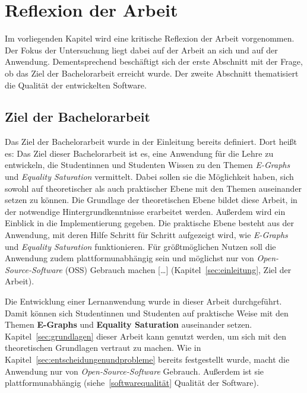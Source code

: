 \section{Reflexion der Arbeit}\label{sec:reflexion}

Im vorliegenden Kapitel wird eine kritische Reflexion der Arbeit vorgenommen. 
Der Fokus der Untersuchung liegt dabei auf der Arbeit an sich und auf der Anwendung.
Dementsprechend beschäftigt sich der erste Abschnitt mit der Frage, ob das Ziel der Bachelorarbeit erreicht wurde.
Der zweite Abschnitt thematisiert die Qualität der entwickelten Software.



\subsection{Ziel der Bachelorarbeit}

Das Ziel der Bachelorarbeit wurde in der Einleitung bereits definiert. Dort heißt es: 
\glqq Das Ziel dieser Bachelorarbeit ist es, eine Anwendung für die Lehre zu entwickeln, die Studentinnen und Studenten Wissen zu den Themen \textit{E-Graphs} und \textit{Equality Saturation}
vermittelt. Dabei sollen sie die Möglichkeit haben, sich sowohl auf theoretischer als auch praktischer Ebene mit den Themen auseinander setzen zu können.
Die Grundlage der theoretischen Ebene bildet diese Arbeit, in der notwendige Hintergrundkenntnisse erarbeitet werden. Außerdem wird ein Einblick in die Implementierung gegeben. 
Die praktische Ebene besteht aus der Anwendung, mit deren Hilfe Schritt für Schritt aufgezeigt wird, wie \textit{E-Graphs} und \textit{Equality Saturation} funktionieren.
Für grö{\ss}tmöglichen Nutzen soll die Anwendung zudem plattformunabhängig sein und möglichst nur von \textit{Open-Source-Software} (OSS) Gebrauch machen [\ldots]\grqq 
(Kapitel~\ref{sec:einleitung}, Ziel der Arbeit).

Die Entwicklung einer Lernanwendung wurde in dieser Arbeit durchgeführt. Damit können sich Studentinnen und Studenten auf praktische Weise mit den Themen 
\textbf{E-Graphs} und \textbf{Equality Saturation} auseinander setzen. Kapitel~\ref{sec:grundlagen} dieser Arbeit kann genutzt werden, um sich mit den
theoretischen Grundlagen vertraut zu machen. 
Wie in Kapitel~\ref{sec:entscheidungenundprobleme} bereits festgestellt wurde, macht die Anwendung nur von \textit{Open-Source-Software} Gebrauch. Außerdem ist
sie plattformunabhängig (siehe~\ref{softwarequalität} Qualität der Software).




